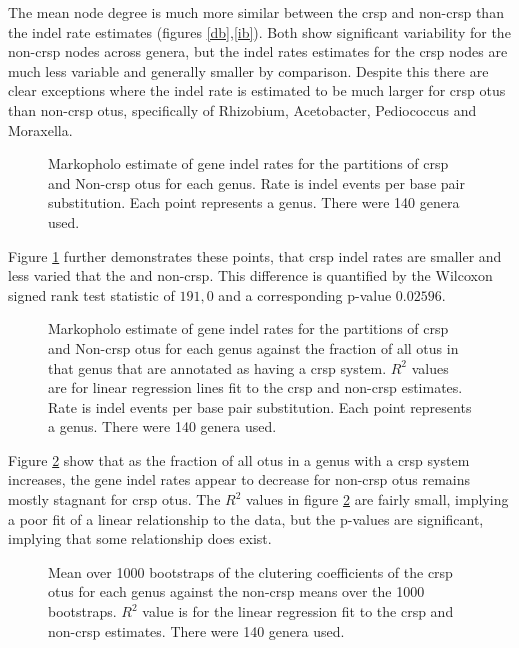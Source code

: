 \FloatBarrier
The mean node degree is much more similar between the \ac{crsp} and non-\ac{crsp} than the indel rate estimates (figures \ref{db},\ref{ib}).
Both show significant variability for the non-\ac{crsp} nodes across genera, but the indel rates estimates for the \ac{crsp} nodes are much less variable and generally smaller by comparison.
Despite this there are clear exceptions where the indel rate is estimated to be much larger for \ac{crsp} \ac{otu}s than non-\ac{crsp} \ac{otu}s, specifically of Rhizobium, Acetobacter, Pediococcus and Moraxella.
\FloatBarrier
\begin{figure}[htb!]
    \caption{Markopholo estimate of gene indel rates for the partitions of \ac{crsp} and Non-\ac{crsp} \ac{otu}s for each genus. Rate is indel events per base pair substitution. Each point represents a genus. There were 140 genera used.}
    \label{is}
\end{figure}
\FloatBarrier
Figure \ref{is} further demonstrates these points, that \ac{crsp} indel rates are smaller and less varied that the and non-\ac{crsp}.
This difference is quantified by the Wilcoxon signed rank test statistic of $191,0$ and a corresponding p-value $0.02596$.
\FloatBarrier
\begin{figure}[htb!]
    \caption{Markopholo estimate of gene indel rates for the partitions of \ac{crsp} and Non-\ac{crsp} \ac{otu}s for each genus against the fraction of all \ac{otu}s in that genus that are annotated as having a \ac{crsp} system. $R^2$ values are for linear regression lines fit to the \ac{crsp} and non-\ac{crsp} estimates. Rate is indel events per base pair substitution. Each point represents a genus. There were 140 genera used.}
    \label{cfrd}
\end{figure}
\FloatBarrier
Figure \ref{cfrd} show that as the fraction of all \ac{otu}s in a genus with a \ac{crsp} system increases, the gene indel rates appear to decrease for non-\ac{crsp} \ac{otu}s remains mostly stagnant for \ac{crsp} \ac{otu}s.
The $R^2$ values in figure \ref{cfrd} are fairly small, implying a poor fit of a linear relationship to the data, but the p-values are significant, implying that some relationship does exist.
\FloatBarrier
\begin{figure}[htb!]
    \caption{Mean over 1000 bootstraps of the clutering coefficients of the \ac{crsp} \ac{otu}s for each genus against the non-\ac{crsp} means over the 1000 bootstraps. $R^2$ value is for the linear regression fit to the \ac{crsp} and non-\ac{crsp} estimates. There were 140 genera used.}
    \label{ccnc}
\end{figure}
